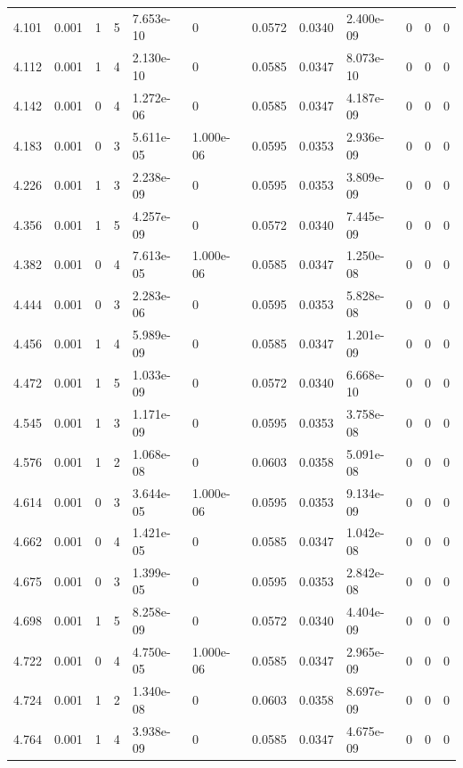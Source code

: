 \documentclass[preview]{standalone}
\begin{document}
{{{{\begin{tabular}{L{1.2cm}C{1.2cm} C{0.3cm}C{0.5cm} C{1.4cm}C{1.4cm} C{1.4cm}C{1.4cm} C{1.6cm}C{1.6cm} C{1.6cm}C{1.6cm}}
  4.101  &  0.001  & 1     &  5 &  7.653e-10  & 0  &  0.0572&   0.0340& 2.400e-09 & 0   &  0 & 0  \\ 
  4.112  &  0.001  & 1     &  4 &  2.130e-10  & 0  &  0.0585&   0.0347& 8.073e-10 & 0   &  0 & 0  \\ 
  4.142  &  0.001  & 0     &  4 &  1.272e-06  & 0  &  0.0585&   0.0347& 4.187e-09 & 0   &  0 & 0  \\ 
  4.183  &  0.001  & 0     &  3 &  5.611e-05  & 1.000e-06  &  0.0595&   0.0353& 2.936e-09 & 0   &  0 & 0  \\ 
  4.226  &  0.001  & 1     &  3 &  2.238e-09  & 0  &  0.0595&   0.0353& 3.809e-09 & 0   &  0 & 0  \\ 
  4.356  &  0.001  & 1     &  5 &  4.257e-09  & 0  &  0.0572&   0.0340& 7.445e-09 & 0   &  0 & 0  \\ 
  4.382  &  0.001  & 0     &  4 &  7.613e-05  & 1.000e-06  &  0.0585&   0.0347& 1.250e-08 & 0   &  0 & 0  \\ 
  4.444  &  0.001  & 0     &  3 &  2.283e-06  & 0  &  0.0595&   0.0353& 5.828e-08 & 0   &  0 & 0  \\ 
  4.456  &  0.001  & 1     &  4 &  5.989e-09  & 0  &  0.0585&   0.0347& 1.201e-09 & 0   &  0 & 0  \\ 
  4.472  &  0.001  & 1     &  5 &  1.033e-09  & 0  &  0.0572&   0.0340& 6.668e-10 & 0   &  0 & 0  \\ 
  4.545  &  0.001  & 1     &  3 &  1.171e-09  & 0  &  0.0595&   0.0353& 3.758e-08 & 0   &  0 & 0  \\ 
  4.576  &  0.001  & 1     &  2 &  1.068e-08  & 0  &  0.0603&   0.0358& 5.091e-08 & 0   &  0 & 0  \\ 
  4.614  &  0.001  & 0     &  3 &  3.644e-05  & 1.000e-06  &  0.0595&   0.0353& 9.134e-09 & 0   &  0 & 0  \\ 
  4.662  &  0.001  & 0     &  4 &  1.421e-05  & 0  &  0.0585&   0.0347& 1.042e-08 & 0   &  0 & 0  \\ 
  4.675  &  0.001  & 0     &  3 &  1.399e-05  & 0  &  0.0595&   0.0353& 2.842e-08 & 0   &  0 & 0  \\ 
  4.698  &  0.001  & 1     &  5 &  8.258e-09  & 0  &  0.0572&   0.0340& 4.404e-09 & 0   &  0 & 0  \\ 
  4.722  &  0.001  & 0     &  4 &  4.750e-05  & 1.000e-06  &  0.0585&   0.0347& 2.965e-09 & 0   &  0 & 0  \\ 
  4.724  &  0.001  & 1     &  2 &  1.340e-08  & 0  &  0.0603&   0.0358& 8.697e-09 & 0   &  0 & 0  \\ 
  4.764  &  0.001  & 1     &  4 &  3.938e-09  & 0  &  0.0585&   0.0347& 4.675e-09 & 0   &  0 & 0  \\ 

\end{tabular}}}}}
\end{document}
